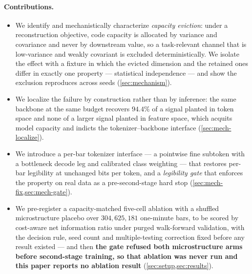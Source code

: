 \documentclass[10pt]{article}
\begin{document}
\paragraph{Contributions.}
\begin{itemize}[leftmargin=1.4em,itemsep=2pt,topsep=2pt]
  \item We identify and mechanistically characterize \emph{capacity eviction}: under a
    reconstruction objective, code capacity is allocated by variance and covariance and never by
    downstream value, so a task-relevant channel that is low-variance and weakly covariant is
    excluded deterministically. We isolate the effect with a fixture in which the evicted
    dimension and the retained ones differ in exactly one property --- statistical independence
    --- and show the exclusion reproduces across seeds (\cref{sec:mechanism}).
  \item We localize the failure by construction rather than by inference: the same backbone at
    the same budget recovers $94.4\%$ of a signal planted in token space and none of a
    larger signal planted in feature space, which acquits model capacity and indicts the
    tokenizer--backbone interface (\cref{sec:mech-localize}).
  \item We introduce a per-bar tokenizer interface --- a pointwise fine subtoken with a
    bottleneck decode leg and calibrated class weighting --- that restores per-bar legibility at
    unchanged bits per token, and a \emph{legibility gate} that enforces the property on real
    data as a pre-second-stage hard stop (\cref{sec:mech-fix,sec:mech-gate}).
  \item We pre-register a capacity-matched five-cell ablation with a shuffled microstructure
    placebo over $304{,}625{,}181$ one-minute bars, to be scored by cost-aware net information
    ratio under purged walk-forward validation, with the decision rule, seed count and
    multiple-testing correction fixed before any result existed --- and then \textbf{the gate
    refused both microstructure arms before second-stage training, so that ablation was never
    run and this paper reports no ablation result} (\cref{sec:setup,sec:results}).
\end{itemize}




\end{document}
